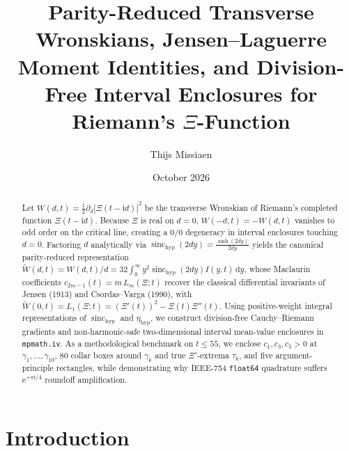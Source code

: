 \documentclass[11pt,a4paper,reqno]{amsart}
\title[Parity-Reduced Wronskians and Interval Enclosures for $\Xi$]{Parity-Reduced Transverse Wronskians, Jensen--Laguerre Moment Identities, and Division-Free Interval Enclosures for Riemann's $\Xi$-Function}
\author{Thijs Missiaen}
\date{October 2026}
\theoremstyle{definition}
\theoremstyle{remark}
\numberwithin{equation}{section}
\newcommand{\dd}{\mathrm{d}}
\newcommand{\ii}{\mathrm{i}}
\newcommand{\ee}{\mathrm{e}}
\newcommand{\Wtil}{\widetilde{W}}
\newcommand{\sinch}{\operatorname{sinc}_{\mathrm{hyp}}}
\newcommand{\etah}{\eta_{\mathrm{hyp}}}
\begin{document}
\begin{abstract}
Let $W(d,t) = \frac{1}{2}\partial_d|\Xi(t-\ii d)|^2$ be the transverse Wronskian of Riemann's completed function $\Xi(t-\ii d)$. Because $\Xi$ is real on $d = 0$, $W(-d,t) = -W(d,t)$ vanishes to odd order on the critical line, creating a $0/0$ degeneracy in interval enclosures touching $d = 0$. Factoring $d$ analytically via $\sinch(2dy) = \frac{\sinh(2dy)}{2dy}$ yields the canonical parity-reduced representation $\Wtil(d,t) = W(d,t)/d = 32\int_0^\infty y^2\sinch(2dy)I(y,t)\,\dd y$, whose Maclaurin coefficients $c_{2m-1}(t) = m\,L_m(\Xi;t)$ recover the classical differential invariants of Jensen (1913) and Csordas--Varga (1990), with $\Wtil(0,t) = L_1(\Xi;t) = (\Xi'(t))^2 - \Xi(t)\Xi''(t)$. Using positive-weight integral representations of $\sinch$ and $\etah$, we construct division-free Cauchy--Riemann gradients and non-harmonic-safe two-dimensional interval mean-value enclosures in \texttt{mpmath.iv}. As a methodological benchmark on $t \le 55$, we enclose $c_1, c_3, c_5 > 0$ at $\gamma_1, \dots, \gamma_{10}$, $80$ collar boxes around $\gamma_k$ and true $\Xi'$-extrema $\tau_k$, and five argument-principle rectangles, while demonstrating why IEEE-754 \texttt{float64} quadrature suffers $\ee^{+\pi t/4}$ roundoff amplification.
\end{abstract}

\maketitle

\section{Introduction}\label{sec:intro}
\end{document}
